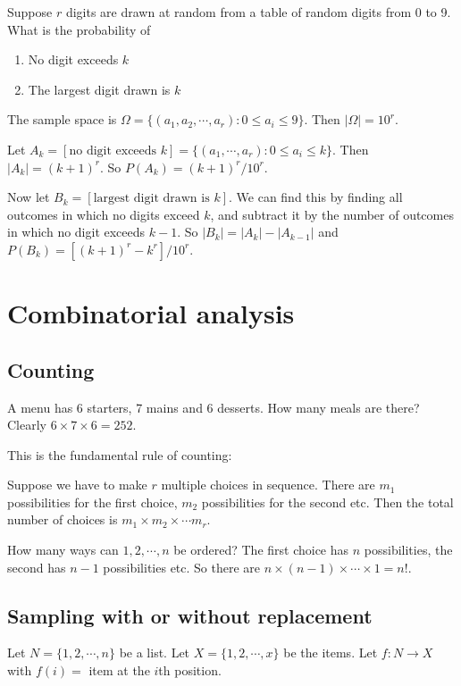 \documentclass[a4paper]{article}
\begin{document}
\begin{eg}
  Suppose $r$ digits are drawn at random from a table of random digits from 0 to 9. What is the probability of
  \begin{enumerate}
    \item No digit exceeds $k$
    \item The largest digit drawn is $k$
  \end{enumerate}

  The sample space is $\Omega = \{(a_1, a_2, \cdots, a_r): 0 \leq a_i \leq 9\}$. Then $|\Omega| = 10^r$.

  Let $A_k = [\text{no digit exceeds }k] = \{(a_1, \cdots, a_r): 0 \leq a_i \leq k\}$. Then $|A_k| = (k + 1)^r$. So $P(A_k) = (k + 1)^r/10^r$.

  Now let $B_k = [\text{largest digit drawn is }k]$. We can find this by finding all outcomes in which no digits exceed $k$, and subtract it by the number of outcomes in which no digit exceeds $k - 1$. So $|B_k| = |A_k| - |A_{k - 1}|$ and $P(B_k) = [(k + 1)^r - k^r]/10^r$.
\end{eg}

\section{Combinatorial analysis}
\subsection{Counting}
\begin{eg}
  A menu has 6 starters, 7 mains and 6 desserts. How many meals are there? Clearly $6 \times 7 \times 6 = 252$.
\end{eg}
This is the fundamental rule of counting:
\begin{thm}
  Suppose we have to make $r$ multiple choices in sequence. There are $m_1$ possibilities for the first choice, $m_2$ possibilities for the second etc. Then the total number of choices is $m_1\times m_2\times \cdots m_r$.
\end{thm}

\begin{eg}
  How many ways can $1, 2, \cdots, n$ be ordered? The first choice has $n$ possibilities, the second has $n - 1$ possibilities etc. So there are $n\times (n - 1)\times\cdots \times 1 = n!$.
\end{eg}

\subsection{Sampling with or without replacement}
Let $N = \{1, 2, \cdots, n\}$ be a list. Let $X = \{1, 2, \cdots, x\}$ be the items. Let $f: N\to X$ with $f(i) =$ item at the $i$th position.
\end{document}
